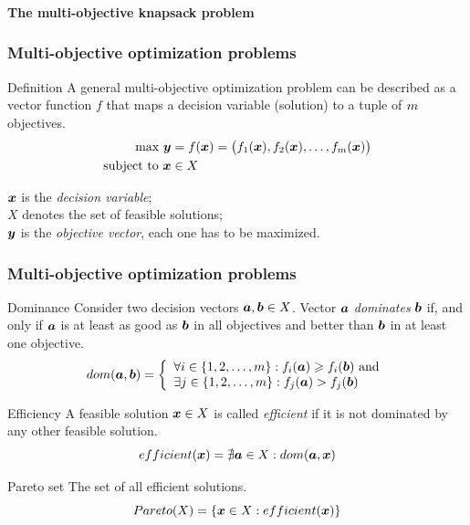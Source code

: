 %
\begin{frame}
\frametitle{}
\begin{center}
  \textbf{\Large The multi-objective knapsack problem}
\end{center}
\end{frame}

\begin{frame}
\frametitle{Multi-objective optimization problems}
\begin{block}{Definition}
  A general multi-objective optimization problem can be described as a vector
  function $f$ that maps a decision variable (solution) to a tuple
  of $m$ objectives. \pause
\begin{align*}
  \text{max} ~ \boldsymbol{y} &= f(\boldsymbol{x}) =
    \big(f_1(\boldsymbol{x})
    ,f_2(\boldsymbol{x})
    ,\ldots
    ,f_{m}(\boldsymbol{x})\big) \\
  \text{subject to} ~ \boldsymbol{x} & \in X
\end{align*}
\end{block}
\pause
\qquad $\boldsymbol{x}$ is the \emph{decision variable}; \pause \\
\qquad $X$ denotes the set of feasible solutions; \pause \\
\qquad $\boldsymbol{y}$ is the \emph{objective vector}, each one has to be maximized.
\end{frame}

\begin{frame}
\frametitle{Multi-objective optimization problems}
\begin{block}{Dominance}
  Consider two decision vectors $\boldsymbol{a}, \boldsymbol{b} \in X$.
  \pause
  Vector $\boldsymbol{a}$ \emph{dominates} $\boldsymbol{b}$ \pause
   if, and only if \pause
   $\boldsymbol{a}$ is at least as good as $\boldsymbol{b}$
  in all objectives \pause
  and better than $\boldsymbol{b}$ in at least one objective. \pause
\begin{displaymath}
    dom(\boldsymbol{a}, \boldsymbol{b}) = \left\{
      \begin{array}{l}
          \forall i \in \{1, 2, \ldots, m\}: f_i(\boldsymbol{a}) \geqslant f_i(\boldsymbol{b}) ~\text{and}\\
          \exists j \in \{1, 2, \ldots, m\}: f_j(\boldsymbol{a}) > f_j(\boldsymbol{b})
  \end{array} \right.
\end{displaymath}
\end{block} \pause
\begin{block}{Efficiency}
A feasible solution $\boldsymbol{x} \in X$ is called \emph{efficient} %
if it is not dominated by any other feasible solution. \pause
\begin{displaymath}
    efficient(\boldsymbol{x}) = \nexists \boldsymbol{a} \in X: dom(\boldsymbol{a}, \boldsymbol{x})
\end{displaymath} \pause
\end{block}
\begin{block}{Pareto set}
The set of all efficient solutions.\pause
\begin{displaymath}
    Pareto(X) = \{ \boldsymbol{x} \in X: efficient(\boldsymbol{x}) \}
\end{displaymath}
\end{block}
\end{frame}

